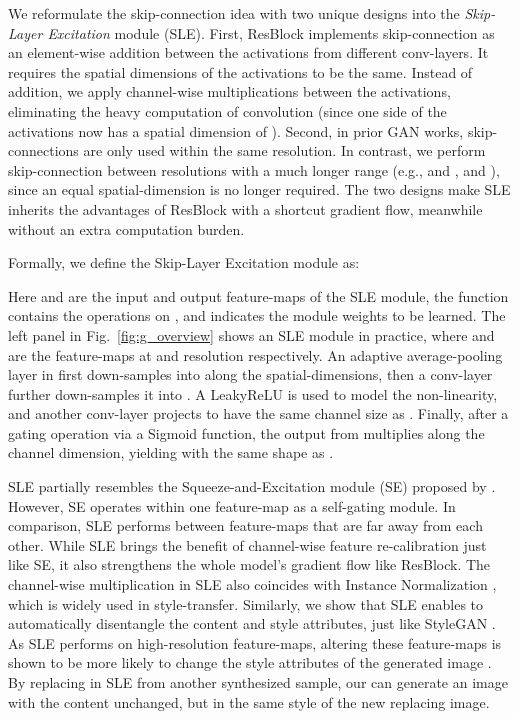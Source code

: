 \documentclass{article} \usepackage{iclr2021_conference,times}
\begin{document}
We reformulate the skip-connection idea with two unique designs into the \textit{Skip-Layer Excitation} module (SLE). First, ResBlock implements skip-connection as an element-wise addition between the activations from different conv-layers. It requires the spatial dimensions of the activations to be the same. Instead of addition, we apply channel-wise multiplications between the activations, eliminating the heavy computation of convolution (since one side of the activations now has a spatial dimension of ). Second, in prior GAN works, skip-connections are only used within the same resolution. In contrast, we perform skip-connection between resolutions with a much longer range (e.g.,  and ,  and ), since an equal spatial-dimension is no longer required. The two designs make SLE inherits the advantages of ResBlock with a shortcut gradient flow, meanwhile without an extra computation burden.

Formally, we define the Skip-Layer Excitation module as:

Here  and  are the input and output feature-maps of the SLE module, the function  contains the operations on , and  indicates the module weights to be learned. The left panel in Fig.~\ref{fig:g_overview} shows an SLE module in practice, where  and  are the feature-maps at  and  resolution respectively. An adaptive average-pooling layer in  first down-samples  into  along the spatial-dimensions, then a conv-layer further down-samples it into . A LeakyReLU is used to model the non-linearity, and another conv-layer projects  to have the same channel size as . Finally, after a gating operation via a Sigmoid function, the output from  multiplies  along the channel dimension, yielding  with the same shape as .  



SLE partially resembles the Squeeze-and-Excitation module (SE) proposed by \citeauthor{hu2018squeeze}. However, SE operates within one feature-map as a self-gating module. In comparison, SLE performs between feature-maps that are far away from each other. While SLE brings the benefit of channel-wise feature re-calibration just like SE, it also strengthens the whole model's gradient flow like ResBlock. The channel-wise multiplication in SLE also coincides with Instance Normalization \citep{ulyanov2016instance,huang2017arbitrary}, which is widely used in style-transfer. Similarly, we show that SLE enables  to automatically disentangle the content and style attributes, just like StyleGAN \citep{karras2019style}. As SLE performs on high-resolution feature-maps, altering these feature-maps is shown to be more likely to change the style attributes of the generated image \citep{karras2019style,liu2020time}. By replacing  in SLE from another synthesized sample, our  can generate an image with the content unchanged, but in the same style of the new replacing image.
\end{document}
